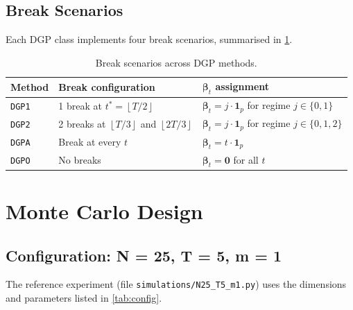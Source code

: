 \documentclass[12pt, a4paper]{article}
\theoremstyle{plain}
\theoremstyle{definition}
\theoremstyle{remark}
\newcommand{\bbeta}{\bm{\beta}}
\newcommand{\floor}[1]{\left\lfloor #1 \right\rfloor}
\begin{document}
\begin{onehalfspacing}
\subsection{Break Scenarios}

Each DGP class implements four break scenarios, summarised in
\cref{tab:scenarios}.

\begin{table}[htb]
  \centering
  \caption{Break scenarios across DGP methods.}
  \label{tab:scenarios}
  \begin{tabular}{lll}
    \toprule
    Method & Break configuration & $\bbeta_t$ assignment \\
    \midrule
    \texttt{DGP1} & 1 break at $t^* = \floor{T/2}$
      & $\bbeta_t = j\cdot\mathbf{1}_p$ for regime $j\in\{0,1\}$ \\
    \texttt{DGP2} & 2 breaks at $\floor{T/3}$ and $\floor{2T/3}$
      & $\bbeta_t = j\cdot\mathbf{1}_p$ for regime $j\in\{0,1,2\}$ \\
    \texttt{DGPA} & Break at every $t$
      & $\bbeta_t = t\cdot\mathbf{1}_p$ \\
    \texttt{DGPO} & No breaks
      & $\bbeta_t = \mathbf{0}$ for all $t$ \\
    \bottomrule
  \end{tabular}
\end{table}

\section{Monte Carlo Design}
\label{sec:mc}

\subsection{Configuration: N = 25, T = 5, m = 1}
\label{sub:N25T5m1}

The reference experiment (file \texttt{simulations/N25\_T5\_m1.py}) uses the
dimensions and parameters listed in \cref{tab:config}.


\end{onehalfspacing}
\end{document}
